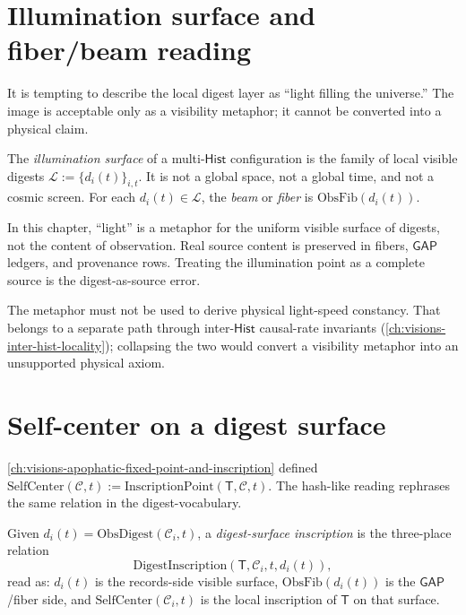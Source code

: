 \section{Illumination surface and fiber/beam reading}
\label{sec:hash-like-illumination-surface}

It is tempting to describe the local digest layer as ``light filling the universe.'' The image is acceptable only as a visibility metaphor; it cannot be converted into a physical claim.

\begin{definition}
\label{def:hash-like-illumination-surface}
The \emph{illumination surface} of a multi-$\mathsf{Hist}$ configuration is the family of local visible digests $\mathcal{L} := \{d_i(t)\}_{i,t}$. It is not a global space, not a global time, and not a cosmic screen. For each $d_i(t) \in \mathcal{L}$, the \emph{beam} or \emph{fiber} is $\mathrm{ObsFib}(d_i(t))$.
\end{definition}

\begin{principle}
\label{prin:hash-like-light-as-visibility}
In this chapter, ``light'' is a metaphor for the uniform visible surface of digests, not the content of observation. Real source content is preserved in fibers, $\mathsf{GAP}$ ledgers, and provenance rows. Treating the illumination point as a complete source is the digest-as-source error.
\end{principle}

The metaphor must not be used to derive physical light-speed constancy. That belongs to a separate path through inter-$\mathsf{Hist}$ causal-rate invariants (\autoref{ch:visions-inter-hist-locality}); collapsing the two would convert a visibility metaphor into an unsupported physical axiom.

\section{Self-center on a digest surface}
\label{sec:hash-like-self-center-on-digest}

\autoref{ch:visions-apophatic-fixed-point-and-inscription} defined $\mathrm{SelfCenter}(\mathcal{C}, t) := \mathrm{InscriptionPoint}(\mathsf{T}, \mathcal{C}, t)$. The hash-like reading rephrases the same relation in the digest-vocabulary.

\begin{definition}
\label{def:hash-like-digest-surface-inscription}
Given $d_i(t) = \mathrm{ObsDigest}(\mathcal{C}_i, t)$, a \emph{digest-surface inscription} is the three-place relation
$$
\mathrm{DigestInscription}(\mathsf{T}, \mathcal{C}_i, t, d_i(t)),
$$
read as: $d_i(t)$ is the records-side visible surface, $\mathrm{ObsFib}(d_i(t))$ is the $\mathsf{GAP}$/fiber side, and $\mathrm{SelfCenter}(\mathcal{C}_i, t)$ is the local inscription of $\mathsf{T}$ on that surface.
\end{definition}


